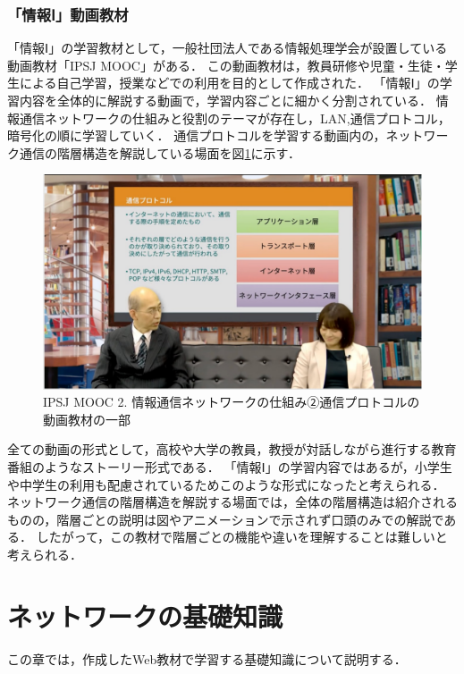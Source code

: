 \documentclass[12pt,a4j,titlepage]{ltjsarticle}
\begin{document}
\clearpage

\subsubsection{「情報Ⅰ」動画教材}
「情報Ⅰ」の学習教材として，一般社団法人である情報処理学会が設置している動画教材「IPSJ MOOC」がある\cite{koukou_douga1}．
この動画教材は，教員研修や児童・生徒・学生による自己学習，授業などでの利用を目的として作成された．
「情報Ⅰ」の学習内容を全体的に解説する動画で，学習内容ごとに細かく分割されている．
情報通信ネットワークの仕組みと役割のテーマが存在し，LAN,通信プロトコル，暗号化の順に学習していく．
通信プロトコルを学習する動画内の，ネットワーク通信の階層構造を解説している場面を図\ref{fig:kou_douga}に示す\cite{koukou_douga2}．

\begin{figure}[h]
\centering
\includegraphics[clip,width=150mm]{figures/koudouga.pdf}
\caption[IPSJ MOOC2. 情報通信ネットワークの仕組み②通信プロトコルの動画教材]{IPSJ MOOC 2. 情報通信ネットワークの仕組み②通信プロトコルの動画教材の一部\linebreak}
\label{fig:kou_douga}
\end{figure}

全ての動画の形式として，高校や大学の教員，教授が対話しながら進行する教育番組のようなストーリー形式である．
「情報Ⅰ」の学習内容ではあるが，小学生や中学生の利用も配慮されているためこのような形式になったと考えられる．
ネットワーク通信の階層構造を解説する場面では，全体の階層構造は紹介されるものの，階層ごとの説明は図やアニメーションで示されず口頭のみでの解説である．
したがって，この教材で階層ごとの機能や違いを理解することは難しいと考えられる．
\clearpage

\section{ネットワークの基礎知識}%
この章では，作成したWeb教材で学習する基礎知識について説明する．
\end{document}
